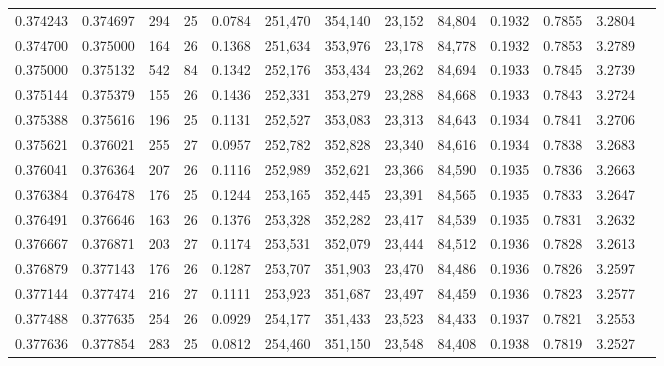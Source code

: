 \begin{tabular}{rrrrrrrrrrrrr}
0.374243 & 0.374697 &    294 &    25 &                                     0.0784 & 251,470 & 354,140 &  23,152 &  84,804 & 0.1932 & 0.7855 & 3.2804 \\
0.374700 & 0.375000 &    164 &    26 &                                     0.1368 & 251,634 & 353,976 &  23,178 &  84,778 & 0.1932 & 0.7853 & 3.2789 \\
0.375000 & 0.375132 &    542 &    84 &                                     0.1342 & 252,176 & 353,434 &  23,262 &  84,694 & 0.1933 & 0.7845 & 3.2739 \\
0.375144 & 0.375379 &    155 &    26 &                                     0.1436 & 252,331 & 353,279 &  23,288 &  84,668 & 0.1933 & 0.7843 & 3.2724 \\
0.375388 & 0.375616 &    196 &    25 &                                     0.1131 & 252,527 & 353,083 &  23,313 &  84,643 & 0.1934 & 0.7841 & 3.2706 \\
0.375621 & 0.376021 &    255 &    27 &                                     0.0957 & 252,782 & 352,828 &  23,340 &  84,616 & 0.1934 & 0.7838 & 3.2683 \\
0.376041 & 0.376364 &    207 &    26 &                                     0.1116 & 252,989 & 352,621 &  23,366 &  84,590 & 0.1935 & 0.7836 & 3.2663 \\
0.376384 & 0.376478 &    176 &    25 &                                     0.1244 & 253,165 & 352,445 &  23,391 &  84,565 & 0.1935 & 0.7833 & 3.2647 \\
0.376491 & 0.376646 &    163 &    26 &                                     0.1376 & 253,328 & 352,282 &  23,417 &  84,539 & 0.1935 & 0.7831 & 3.2632 \\
0.376667 & 0.376871 &    203 &    27 &                                     0.1174 & 253,531 & 352,079 &  23,444 &  84,512 & 0.1936 & 0.7828 & 3.2613 \\
0.376879 & 0.377143 &    176 &    26 &                                     0.1287 & 253,707 & 351,903 &  23,470 &  84,486 & 0.1936 & 0.7826 & 3.2597 \\
0.377144 & 0.377474 &    216 &    27 &                                     0.1111 & 253,923 & 351,687 &  23,497 &  84,459 & 0.1936 & 0.7823 & 3.2577 \\
0.377488 & 0.377635 &    254 &    26 &                                     0.0929 & 254,177 & 351,433 &  23,523 &  84,433 & 0.1937 & 0.7821 & 3.2553 \\
0.377636 & 0.377854 &    283 &    25 &                                     0.0812 & 254,460 & 351,150 &  23,548 &  84,408 & 0.1938 & 0.7819 & 3.2527 \\

\end{tabular}
